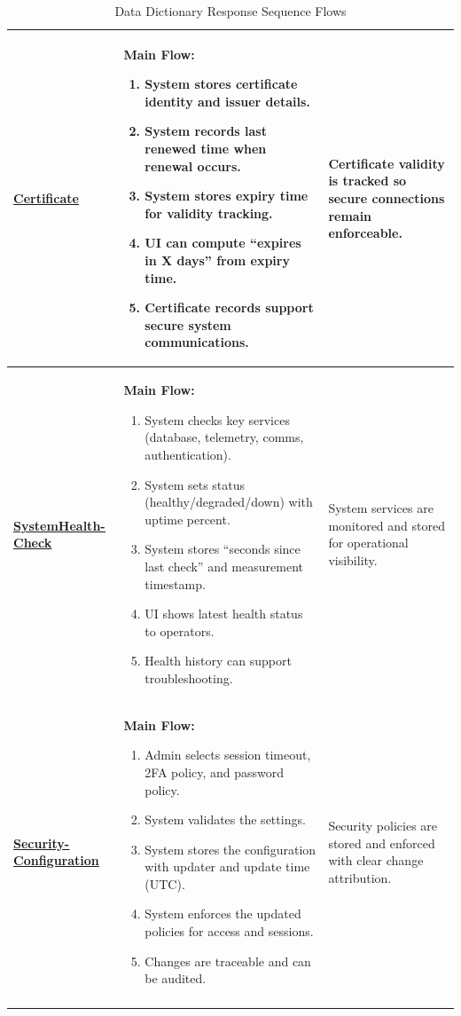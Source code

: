 \documentclass[11pt,a4paper]{article}
\let\orighyperref\hyperref
\renewcommand{\hyperref}[2][]{\orighyperref[#1]{\uline{#2}}}%
\begin{document}
\begin{longtable}{|>{\raggedright\arraybackslash}p{}|>{\raggedright\arraybackslash}p{}|>{\raggedright\arraybackslash}p{}|}
\textbf{\hyperref[tab:data-dictionary-certificate]{Certificate}}\label{flow-Certificate} &
\textbf{Main Flow:}\begin{enumerate}[leftmargin=*,nosep]
  \item System stores certificate identity and issuer details.
  \item System records last renewed time when renewal occurs.
  \item System stores expiry time for validity tracking.
  \item UI can compute “expires in X days” from expiry time.
  \item Certificate records support secure system communications.
\end{enumerate} &
Certificate validity is tracked so secure connections remain enforceable. \\
\hline

\textbf{\hyperref[tab:data-dictionary-systemhealthcheck]{SystemHealth-\allowbreak Check}}\label{flow-SystemHealthCheck} &
\textbf{Main Flow:}\begin{enumerate}[leftmargin=*,nosep]
  \item System checks key services (database, telemetry, comms, authentication).
  \item System sets status (healthy/degraded/down) with uptime percent.
  \item System stores “seconds since last check” and measurement timestamp.
  \item UI shows latest health status to operators.
  \item Health history can support troubleshooting.
\end{enumerate} &
System services are monitored and stored for operational visibility. \\
\hline

\textbf{\hyperref[tab:data-dictionary-securityconfiguration]{Security-\allowbreak Configuration}}\label{flow-SecurityConfiguration} &
\textbf{Main Flow:}\begin{enumerate}[leftmargin=*,nosep]
  \item Admin selects session timeout, 2FA policy, and password policy.
  \item System validates the settings.
  \item System stores the configuration with updater and update time (UTC).
  \item System enforces the updated policies for access and sessions.
  \item Changes are traceable and can be audited.
\end{enumerate} &
Security policies are stored and enforced with clear change attribution. \\
\hline
\caption{Data Dictionary Response Sequence Flows}\label{tab:dd-response-sequence}
\end{longtable}
\end{document}
